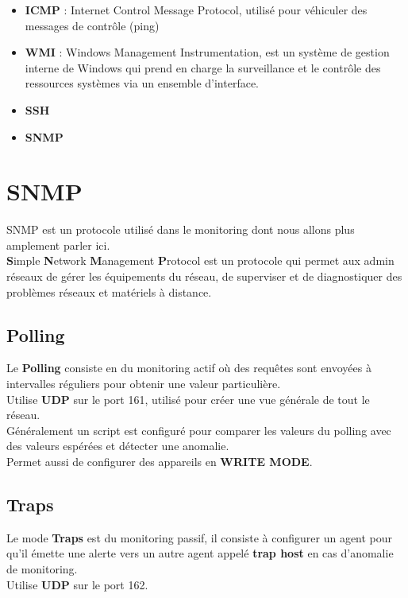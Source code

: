\documentclass{report}
\begin{document}
		\begin{itemize}
			\item \textbf{ICMP} : Internet Control Message Protocol, utilisé pour véhiculer des messages de contrôle (ping)
			\item \textbf{WMI} : Windows Management Instrumentation, est un système de gestion interne de Windows qui prend en charge la surveillance et le contrôle des ressources systèmes via un ensemble d'interface.
			\item \textbf{SSH}
			\item \textbf{SNMP}
		\end{itemize}

	\section{SNMP}

		SNMP est un protocole utilisé dans le monitoring dont nous allons plus amplement parler ici.\\

		\textbf{S}imple \textbf{N}etwork \textbf{M}anagement \textbf{P}rotocol est un protocole qui permet aux admin réseaux de gérer les équipements du réseau, de superviser et de diagnostiquer des problèmes réseaux et matériels à distance.\\

		\subsection{Polling}

			Le \textbf{Polling} consiste en du monitoring actif où des requêtes sont envoyées à intervalles réguliers pour obtenir une valeur particulière.\\
			Utilise \textbf{UDP} sur le port 161, utilisé pour créer une vue générale de tout le réseau.\\

			Généralement un script est configuré pour comparer les valeurs du polling avec des valeurs espérées et détecter une anomalie.\\

			Permet aussi de configurer des appareils en \textbf{WRITE MODE}.\\

		\subsection{Traps}

			Le mode \textbf{Traps} est du monitoring passif, il consiste à configurer un agent pour qu'il émette une alerte vers un autre agent appelé \textbf{trap host} en cas d'anomalie de monitoring.\\
			Utilise \textbf{UDP} sur le port 162.\\
\end{document}
